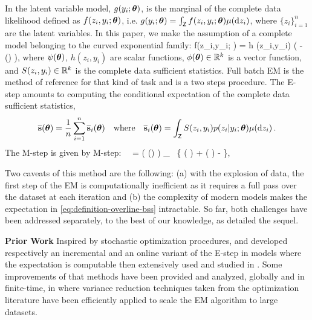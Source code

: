 \documentclass[11pt]{article}
\theoremstyle{t}
\begin{document}
In the latent variable model,  $g(y_i ; {\bm{\theta}})$, is the marginal of the
complete data likelihood defined as $f(z_i,y_i; {\bm{\theta}})$, i.e. $g(y_i; {\bm{\theta}}) = \int_{\mathsf{Z}} f (z_i,y_i;{\bm{\theta}}) \mu(\mathrm d z_i)$, where $\{ z_i \}_{i=1}^n$ are the latent variables.  
In this paper, we make the assumption of a complete model belonging to the curved exponential family:
\beq \label{eq:exp}
f(z_i,y_i; \param) = h  (z_i,y_i) \exp \big(  - \psi(\param) \big)\eqs,
\eeq
where $\psi({\bm{\theta}})$, $h(z_i,y_i)$ are scalar functions, $\phi({\bm{\theta}}) \in \mathbb{R}^k$ is a vector function, and $S(z_i,y_i) \in \mathbb{R}^k$ is the complete data sufficient statistics.
Full batch EM \citep{dempster1977Maximum} is the method of reference for that kind of task and is a two steps procedure. The {\sf E-step} amounts to computing the conditional expectation of the complete data sufficient statistics, 
\begin{equation}
\label{eq:definition-overline-bss}
\overline{{\mathbf{s}}}({\bm{\theta}})= \frac{1}{n} \sum_{i=1}^n \overline{{\mathbf{s}}}_i({\bm{\theta}}) \quad  \text{where}  \quad \overline{{\mathbf{s}}}_i({\bm{\theta}})= \int_{\mathsf{Z}} S(z_i,y_i) p(z_i|y_i;{\bm{\theta}}) \mu(\mathrm d z_i) \,.
\end{equation}
The {\sf M-step} is given by
\beq \label{eq:mstep}
\textsf{M-step:}~~\hat{\param} = \overline{\param}( \overline{\bss}(\param) ) \eqdef \argmin_{ \vartheta \in \Param } ~\big\{ \Pen( \vartheta ) + \psi( \vartheta) - \pscal{ \overline{\bss}(\param)}{ \phi ( \vartheta) } \big\},
\eeq

Two caveats of this method are the following: \textsf{(a)} with the explosion of data, the first step of the EM is computationally inefficient as it requires a full pass over the dataset at each iteration and \textsf{(b)} the complexity of modern models makes the expectation in \eqref{eq:definition-overline-bss} intractable. 
So far, both challenges have been addressed separately, to the best of our knowledge, as detailed the sequel.

\textbf{Prior Work} Inspired by stochastic optimization procedures, \citep{neal1998view} and \citep{cappe2009line} developed respectively an incremental and an online variant of the \textsf{E-step} in models where the expectation is computable then extensively used and studied in \citep{nguyen2020mini, liang2009online,cappe2011online}.
Some improvements of that methods have been provided and analyzed, globally and in finite-time, in \citep{karimi2019global} where variance reduction techniques taken from the optimization literature have been efficiently applied to scale the EM algorithm to large datasets.
\end{document}
